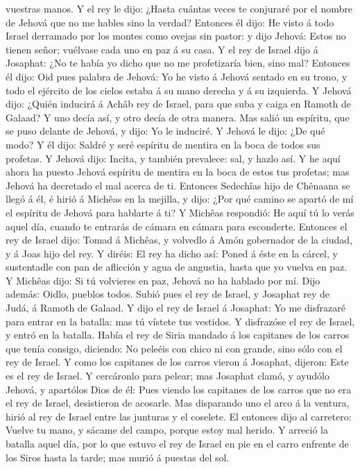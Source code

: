 vuestras manos.  Y el rey le dijo: ¿Hasta cuántas veces te
conjuraré por el nombre de Jehová que no me hables sino la verdad?
 Entonces él dijo: He visto á todo Israel derramado por los
montes como ovejas sin pastor: y dijo Jehová: Estos no tienen señor;
vuélvase cada uno en paz á su casa.  Y el rey de Israel
dijo á Josaphat: ¿No te había yo dicho que no me profetizaría bien, sino
mal?  Entonces él dijo: Oid pues palabra de Jehová: Yo he
visto á Jehová sentado en su trono, y todo el ejército de los cielos
estaba á su mano derecha y á su izquierda.  Y Jehová dijo:
¿Quién inducirá á Achâb rey de Israel, para que suba y caiga en Ramoth
de Galaad? Y uno decía así, y otro decía de otra manera. 
Mas salió un espíritu, que se puso delante de Jehová, y dijo: Yo le
induciré. Y Jehová le dijo: ¿De qué modo?  Y él dijo:
Saldré y seré espíritu de mentira en la boca de todos sus profetas. Y
Jehová dijo: Incita, y también prevalece: sal, y hazlo así.
 Y he aquí ahora ha puesto Jehová espíritu de mentira en la
boca de estos tus profetas; mas Jehová ha decretado el mal acerca de ti.
 Entonces Sedechîas hijo de Chênaana se llegó á él, é hirió
á Michêas en la mejilla, y dijo: ¿Por qué camino se apartó de mí el
espíritu de Jehová para hablarte á ti?  Y Michêas
respondió: He aquí tú lo verás aquel día, cuando te entrarás de cámara
en cámara para esconderte.  Entonces el rey de Israel dijo:
Tomad á Michêas, y volvedlo á Amón gobernador de la ciudad, y á Joas
hijo del rey.  Y diréis: El rey ha dicho así: Poned á éste
en la cárcel, y sustentadle con pan de aflicción y agua de angustia,
hasta que yo vuelva en paz.  Y Michêas dijo: Si tú
volvieres en paz, Jehová no ha hablado por mí. Dijo además: Oidlo,
pueblos todos.  Subió pues el rey de Israel, y Josaphat rey
de Judá, á Ramoth de Galaad.  Y dijo el rey de Israel á
Josaphat: Yo me disfrazaré para entrar en la batalla: mas tú vístete tus
vestidos. Y disfrazóse el rey de Israel, y entró en la batalla.
 Había el rey de Siria mandado á los capitanes de los
carros que tenía consigo, diciendo: No peleéis con chico ni con grande,
sino sólo con el rey de Israel.  Y como los capitanes de
los carros vieron á Josaphat, dijeron: Este es el rey de Israel. Y
cercáronlo para pelear; mas Josaphat clamó, y ayudólo Jehová, y
apartólos Dios de él:  Pues viendo los capitanes de los
carros que no era el rey de Israel, desistieron de acosarle.
 Mas disparando uno el arco á la ventura, hirió al rey de
Israel entre las junturas y el coselete. El entonces dijo al carretero:
Vuelve tu mano, y sácame del campo, porque estoy mal herido.
 Y arreció la batalla aquel día, por lo que estuvo el rey
de Israel en pie en el carro enfrente de los Siros hasta la tarde; mas
murió á puestas del sol.

